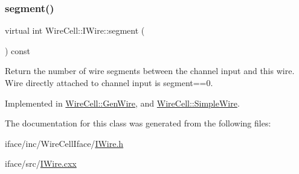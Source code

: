 \subsubsection{\texorpdfstring{segment()}{segment()}}
{\footnotesize\ttfamily virtual int Wire\+Cell\+::\+I\+Wire\+::segment (\begin{DoxyParamCaption}{ }\end{DoxyParamCaption}) const\hspace{0.3cm}{\ttfamily [pure virtual]}}

Return the number of wire segments between the channel input and this wire. Wire directly attached to channel input is segment==0. 

Implemented in \hyperlink{class_wire_cell_1_1_gen_wire_a27ade571103d3591a7addd4ff9dd757f}{Wire\+Cell\+::\+Gen\+Wire}, and \hyperlink{class_wire_cell_1_1_simple_wire_a965be3ecc234084376422ef89af0958c}{Wire\+Cell\+::\+Simple\+Wire}.



The documentation for this class was generated from the following files\+:\begin{DoxyCompactItemize}
\item 
iface/inc/\+Wire\+Cell\+Iface/\hyperlink{_i_wire_8h}{I\+Wire.\+h}\item 
iface/src/\hyperlink{_i_wire_8cxx}{I\+Wire.\+cxx}\end{DoxyCompactItemize}
